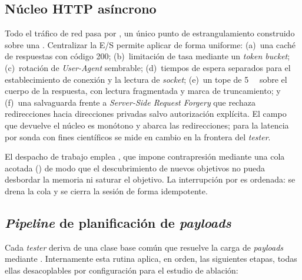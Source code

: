 \subsection{Núcleo HTTP asíncrono}
\label{sec:nucleo}

Todo el tráfico de red pasa por , un único
punto de estrangulamiento construido sobre una .
Centralizar la E/S permite aplicar de forma uniforme: (a)~una caché de
respuestas  con código \num{200}; (b)~limitación de tasa mediante un
\emph{token bucket}; (c)~rotación de \emph{User-Agent} sembrable; (d)~tiempos
de espera separados para el establecimiento de conexión y la lectura de
\emph{socket}; (e)~un tope de \SI{5}{\mebi\byte} sobre el cuerpo de la
respuesta, con lectura fragmentada y marca de truncamiento; y (f)~una
salvaguarda frente a \emph{Server-Side Request Forgery} que rechaza
redirecciones hacia direcciones privadas salvo autorización explícita. El
campo  que devuelve el núcleo es monótono y abarca las
redirecciones; para la latencia por sonda con fines científicos se mide en
cambio  en la frontera del \emph{tester}.

El despacho de trabajo emplea , que impone
contrapresión mediante una cola acotada () de modo que el
descubrimiento de nuevos objetivos no pueda desbordar la memoria ni saturar el
objetivo. La interrupción por  es ordenada: se drena la cola y se
cierra la sesión de forma idempotente.

\subsection{\emph{Pipeline} de planificación de \emph{payloads}}
\label{sec:pipeline}

Cada \emph{tester} deriva de una clase base común que resuelve la carga de
\emph{payloads} mediante . Internamente esta rutina
aplica, en orden, las siguientes etapas, todas ellas desacoplables por
configuración para el estudio de ablación:


